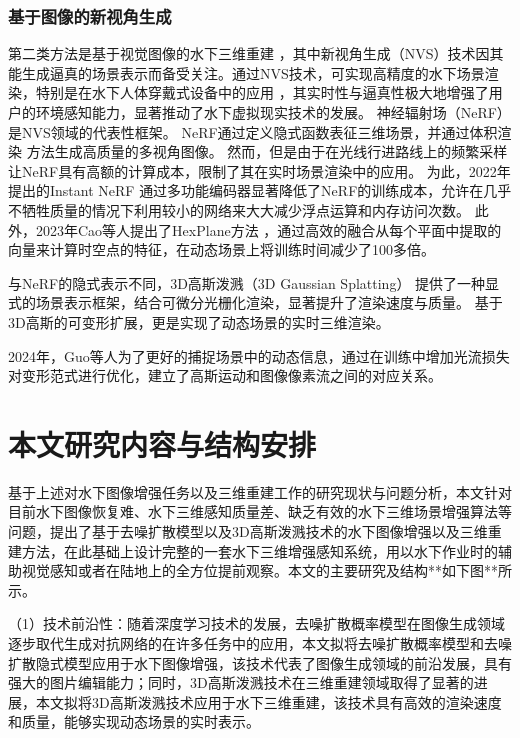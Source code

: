 \subsubsection{基于图像的新视角生成}
第二类方法是基于视觉图像的水下三维重建 \cite{vision_recon}，其中新视角生成（NVS）技术因其能生成逼真的场景表示而备受关注。通过NVS技术，可实现高精度的水下场景渲染，特别是在水下人体穿戴式设备中的应用 \cite{Xia2023}，其实时性与逼真性极大地增强了用户的环境感知能力，显著推动了水下虚拟现实技术的发展。
神经辐射场（NeRF） \cite{nerf}\cite{Mip_nerf360} 是NVS领域的代表性框架。
NeRF通过定义隐式函数表征三维场景，并通过体积渲染 \cite{volume_render} 方法生成高质量的多视角图像。
然而，但是由于在光线行进路线上的频繁采样让NeRF具有高额的计算成本，限制了其在实时场景渲染中的应用。
为此，2022年提出的Instant NeRF \cite{instant_nerf} 通过多功能编码器显著降低了NeRF的训练成本，允许在几乎不牺牲质量的情况下利用较小的网络来大大减少浮点运算和内存访问次数。
此外，2023年Cao等人提出了HexPlane方法 \cite{hex_plane}，通过高效的融合从每个平面中提取的向量来计算时空点的特征，在动态场景上将训练时间减少了100多倍。

与NeRF的隐式表示不同，3D高斯泼溅（3D Gaussian Splatting） \cite{3DGS} 提供了一种显式的场景表示框架，结合可微分光栅化渲染，显著提升了渲染速度与质量。
基于3D高斯的可变形扩展\cite{dynamic_3DGS1}\cite{dynamic_3DGS2}\cite{dynamic_3DGS_efficient}\cite{4DGS}，更是实现了动态场景的实时三维渲染。


2024年，Guo等人\cite{flow_2024motion}为了更好的捕捉场景中的动态信息，通过在训练中增加光流损失对变形范式进行优化，建立了高斯运动和图像像素流之间的对应关系。

\section{本文研究内容与结构安排}
基于上述对水下图像增强任务以及三维重建工作的研究现状与问题分析，本文针对目前水下图像恢复难、水下三维感知质量差、缺乏有效的水下三维场景增强算法等问题，提出了基于去噪扩散模型以及3D高斯泼溅技术的水下图像增强以及三维重建方法，在此基础上设计完整的一套水下三维增强感知系统，用以水下作业时的辅助视觉感知或者在陆地上的全方位提前观察。本文的主要研究及结构**如下图**所示。

（1）技术前沿性：随着深度学习技术的发展，去噪扩散概率模型在图像生成领域逐步取代生成对抗网络的在许多任务中的应用，本文拟将去噪扩散概率模型和去噪扩散隐式模型应用于水下图像增强，该技术代表了图像生成领域的前沿发展，具有强大的图片编辑能力；同时，3D高斯泼溅技术在三维重建领域取得了显著的进展，本文拟将3D高斯泼溅技术应用于水下三维重建，该技术具有高效的渲染速度和质量，能够实现动态场景的实时表示。

